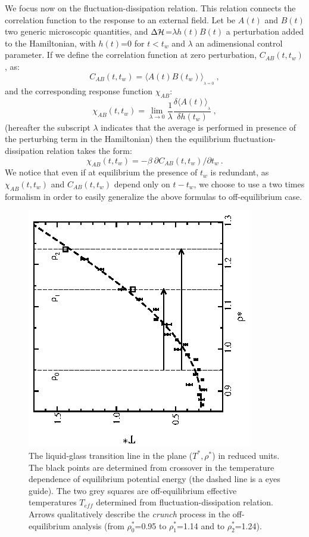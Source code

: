 We focus now on the fluctuation-dissipation relation.
This relation connects the correlation function to the
response to an external field.
Let be $A(t)$ and $B(t)$ two generic  microscopic quantities,
and $\Delta {\cal H}$=$\lambda h(t) B(t)$
a perturbation added to the Hamiltonian, with $h(t)$=0 for $t$$<$$t_w$
and $\lambda$ an adimensional control parameter.
If we define the correlation function at
zero perturbation, $C_{AB}(t,t_w)$, as:
\begin{equation}
C_{AB}(t,t_w)=\langle A(t)B(t_w) \rangle_{_{\lambda =0}} \ ,
\label{corr}
\end{equation}
and the corresponding response function $\chi_{AB}$:
\begin{equation}
\chi_{AB}(t,t_w) = \lim_{\lambda \rightarrow 0} \frac{1}{\lambda}
\frac{\delta \langle A(t) \rangle_{_{\lambda}}}{\delta h(t_w)} \ ,
\label{resp}
\end{equation}
(hereafter the subscript $\lambda$ indicates that the average is
performed in presence of the perturbing term in the Hamiltonian)
then the equilibrium fluctuation-dissipation relation takes the form:
\begin{equation}
\chi_{AB}(t,t_w)=-\beta \  \partial C_{AB}(t,t_w) / \partial t_w \ .
\label{fluc_1}
\end{equation}
We notice that even if at equilibrium the presence of $t_w$ is redundant,
as $\chi_{AB}(t,t_w)$ and $C_{AB}(t,t_w)$ depend only on $t-t_w$,
we choose to use a two times formalism in order to easily generalize the above
formulas to off-equilibrium case.
\begin{figure}[t]
\centering
\vspace{-1.cm}
\includegraphics[width=.35\textwidth,angle=-90]{Tg2.ps}
\caption{The liquid-glass transition line in the plane ($T^*,\rho^*$) in reduced units.
The black points are determined from crossover in the temperature dependence
of equilibrium potential energy (the dashed line is a eyes guide).
The two grey squares are off-equilibrium effective temperatures $T_{\!e\!f\!\!f}$
determined from fluctuation-dissipation relation. Arrows qualitatively describe
the {\it crunch} process in the off-equilibrium analysis
(from $\rho^*_0$=0.95 to $\rho^*_1$=1.14  and to $\rho^*_2$=1.24).
}
\label{fig_2}
\end{figure}
